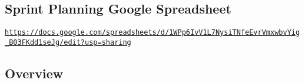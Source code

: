 \href{https://travis-ci.org/yhsueh/Midterm}{\tt }

\subsection*{\href{https://coveralls.io/github/yhsueh/Midterm?branch=master}{\tt } }

\subsection*{Sprint Planning Google Spreadsheet}

\href{https://docs.google.com/spreadsheets/d/1WPp6IvV1L7NysiTNfeEvrVmxwbvYig_B03FKdd1seJg/edit?usp=sharing}{\tt https\+://docs.\+google.\+com/spreadsheets/d/1\+W\+Pp6\+Iv\+V1\+L7\+Nysi\+T\+Nfe\+Evr\+Vmxwbv\+Yig\+\_\+\+B03\+F\+Kdd1se\+Jg/edit?usp=sharing}

\subsection*{Overview}


